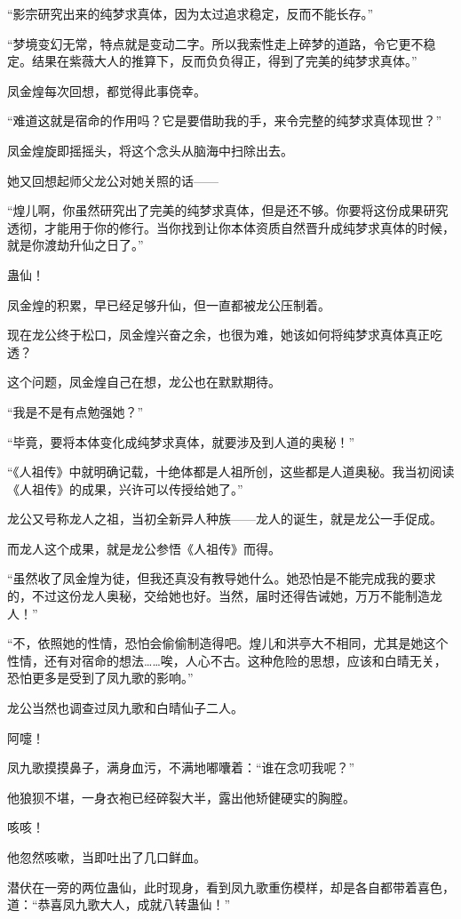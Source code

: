 \begin{this_body}
“影宗研究出来的纯梦求真体，因为太过追求稳定，反而不能长存。”

“梦境变幻无常，特点就是变动二字。所以我索性走上碎梦的道路，令它更不稳定。结果在紫薇大人的推算下，反而负负得正，得到了完美的纯梦求真体。”

凤金煌每次回想，都觉得此事侥幸。

“难道这就是宿命的作用吗？它是要借助我的手，来令完整的纯梦求真体现世？”

凤金煌旋即摇摇头，将这个念头从脑海中扫除出去。

她又回想起师父龙公对她关照的话——

“煌儿啊，你虽然研究出了完美的纯梦求真体，但是还不够。你要将这份成果研究透彻，才能用于你的修行。当你找到让你本体资质自然晋升成纯梦求真体的时候，就是你渡劫升仙之日了。”

蛊仙！

凤金煌的积累，早已经足够升仙，但一直都被龙公压制着。

现在龙公终于松口，凤金煌兴奋之余，也很为难，她该如何将纯梦求真体真正吃透？

这个问题，凤金煌自己在想，龙公也在默默期待。

“我是不是有点勉强她？”

“毕竟，要将本体变化成纯梦求真体，就要涉及到人道的奥秘！”

“《人祖传》中就明确记载，十绝体都是人祖所创，这些都是人道奥秘。我当初阅读《人祖传》的成果，兴许可以传授给她了。”

龙公又号称龙人之祖，当初全新异人种族——龙人的诞生，就是龙公一手促成。

而龙人这个成果，就是龙公参悟《人祖传》而得。

“虽然收了凤金煌为徒，但我还真没有教导她什么。她恐怕是不能完成我的要求的，不过这份龙人奥秘，交给她也好。当然，届时还得告诫她，万万不能制造龙人！”

“不，依照她的性情，恐怕会偷偷制造得吧。煌儿和洪亭大不相同，尤其是她这个性情，还有对宿命的想法……唉，人心不古。这种危险的思想，应该和白晴无关，恐怕更多是受到了凤九歌的影响。”

龙公当然也调查过凤九歌和白晴仙子二人。

阿嚏！

凤九歌摸摸鼻子，满身血污，不满地嘟囔着：“谁在念叨我呢？”

他狼狈不堪，一身衣袍已经碎裂大半，露出他矫健硬实的胸膛。

咳咳！

他忽然咳嗽，当即吐出了几口鲜血。

潜伏在一旁的两位蛊仙，此时现身，看到凤九歌重伤模样，却是各自都带着喜色，道：“恭喜凤九歌大人，成就八转蛊仙！”


\end{this_body}
